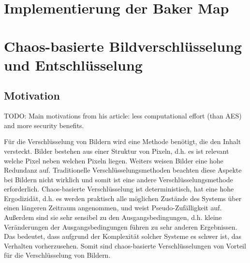 
\usepackage[naustrian]{babel}


\maketitle

\section{Implementierung der Baker Map}
% 

\section{Chaos-basierte Bildverschlüsselung und Entschlüsselung}
\subsection{Motivation}
TODO: Main motivations from his article: less computational effort (than AES) and more security benefits.

Für die Verschlüsselung von Bildern wird eine Methode benötigt, die den Inhalt
versteckt. Bilder bestehen aus einer Struktur von Pixeln, d.h. es ist relevant welche Pixel neben welchen
Pixeln liegen. Weiters weisen Bilder eine hohe Redundanz auf. Traditionelle Verschlüsselungsmethoden beachten
diese Aspekte bei Bildern nicht wirklich und somit ist eine andere Verschlüsselungsmethode erforderlich.
Chaos-basierte Verschlüsselung ist deterministisch, hat eine hohe Ergodizidät, d.h. es werden praktisch alle
möglichen Zustände des Systems über einen längeren Zeitraum angenommen, und weist Pseudo-Zufälligkeit auf. Außerdem
sind sie sehr sensibel zu den Ausgangsbedingungen, d.h. kleine Veränderungen der Ausgangsbedingungen führen zu
sehr anderen Ergebnissen. Das bedeutet, dass aufgrund der Komplexität solcher Systeme es schwer ist,
das Verhalten vorherzusehen.
Somit sind chaos-basierte Verschlüsselungen von Vorteil für die Verschlüsselung von Bildern.
\cite{zhang2023}

